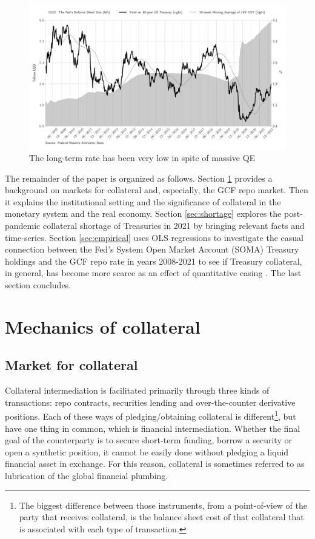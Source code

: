 \documentclass[11pt,a4paper,english,oneside]{article}
\begin{document}
\begin{figure}[htb!]
  \begin{center}
    \caption{The long-term rate has been very low in spite of massive QE}
    \label{Feds_BS}
    \includegraphics[width=0.99\linewidth]{fed_bs.pdf}
  \end{center}
\end{figure}

The remainder of the paper is organized as follows. Section \ref{sec:mechanics} provides a background on markets for collateral and, especially, the GCF repo market. Then it explains the institutional setting and the significance of collateral in the monetary system and the real economy. Section \ref{sec:shortage} explores the post-pandemic collateral shortage of Treasuries in 2021 by bringing relevant facts and time-series. Section \ref{sec:empirical} uses OLS regressions to investigate the casual connection between the Fed's System Open Market Account (SOMA) Treasury holdings and the GCF repo rate in years 2008-2021 to see if Treasury collateral, in general, has become more scarce as an effect of quantitative easing . The last section concludes.

\newpage

\section{Mechanics of collateral} \label{sec:mechanics}

\subsection{Market for collateral}

Collateral intermediation is facilitated primarily through three kinds of transactions: repo contracts, securities lending and over-the-counter derivative positions. Each of these ways of pledging/obtaining collateral is different\footnote{The biggest difference between those instruments, from a point-of-view of the party that receives collateral, is the balance sheet cost of that collateral that is associated with each type of transaction.}, but have one thing in common, which is financial intermediation. Whether the final goal of the counterparty is to secure short-term funding, borrow a security or open a synthetic position, it cannot be easily done without pledging a liquid financial asset in exchange. For this reason, collateral is sometimes referred to as lubrication of the global financial plumbing.
\end{document}
